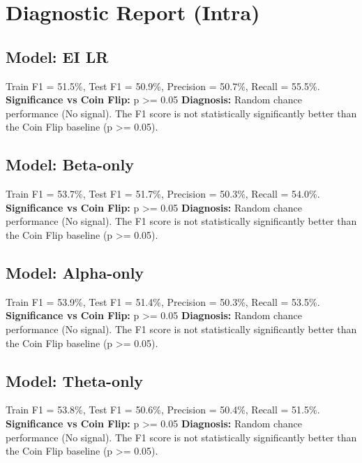 \section*{Diagnostic Report (Intra)}
\subsection*{Model: EI LR}
Train F1 = 51.5\%, Test F1 = 50.9\%, Precision = 50.7\%, Recall = 55.5\%.
\newline
\textbf{Significance vs Coin Flip:} p >= 0.05
\newline
\textbf{Diagnosis:} Random chance performance (No signal). The F1 score is not statistically significantly better than the Coin Flip baseline (p >= 0.05).

\subsection*{Model: Beta-only}
Train F1 = 53.7\%, Test F1 = 51.7\%, Precision = 50.3\%, Recall = 54.0\%.
\newline
\textbf{Significance vs Coin Flip:} p >= 0.05
\newline
\textbf{Diagnosis:} Random chance performance (No signal). The F1 score is not statistically significantly better than the Coin Flip baseline (p >= 0.05).

\subsection*{Model: Alpha-only}
Train F1 = 53.9\%, Test F1 = 51.4\%, Precision = 50.3\%, Recall = 53.5\%.
\newline
\textbf{Significance vs Coin Flip:} p >= 0.05
\newline
\textbf{Diagnosis:} Random chance performance (No signal). The F1 score is not statistically significantly better than the Coin Flip baseline (p >= 0.05).

\subsection*{Model: Theta-only}
Train F1 = 53.8\%, Test F1 = 50.6\%, Precision = 50.4\%, Recall = 51.5\%.
\newline
\textbf{Significance vs Coin Flip:} p >= 0.05
\newline
\textbf{Diagnosis:} Random chance performance (No signal). The F1 score is not statistically significantly better than the Coin Flip baseline (p >= 0.05).

